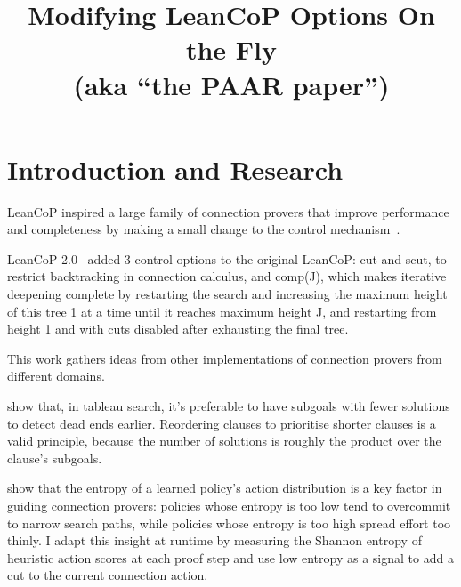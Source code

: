 \documentclass[11pt,twocolumn]{article}
\title{Modifying LeanCoP Options On the Fly \\[3pt] \large (aka ``the PAAR paper'')}
\date{}
\author{}
\newcommand{\atom}[1]{\colorbox{Gray!30}{\ttfamily #1}}
\newcommand{\citen}[1]{~\parencite{#1}}
\newcommand{\citeay}[1]{\textcite{#1}}
\begin{document}
\twocolumn[
	\centering
	\vspace{1em}
	{\LARGE Modifying LeanCoP Options On the Fly \par} \vspace{3pt}
	{\large (aka ``the PAAR paper'') \par}
	\vspace{2em}
]

\section{Introduction and Research}

LeanCoP inspired a large family of connection provers that improve performance and completeness by making a small change to the control mechanism\citen{Otten2023leanCoP20}.

LeanCoP 2.0\citen{ottenLeanCoP20} added 3 control options to the original LeanCoP: \atom{cut} and \atom{scut}, to restrict backtracking in connection calculus, and \atom{comp(J)}, which makes iterative deepening complete by restarting the search and increasing the maximum height of this tree 1 at a time until it reaches maximum height \atom{J}, and restarting from height 1 and with cuts disabled after exhausting the final tree.

This work gathers ideas from other implementations of connection provers from different domains.

\citeay{letzModelEliminationConnection2001} show that, in tableau search, it's preferable to have subgoals with fewer solutions to detect dead ends earlier.
Reordering clauses to prioritise shorter clauses is a valid principle, because the number of solutions is roughly the product over the clause's subgoals.


\citeay{zomboriRoleEntropyGuiding2021} show that the entropy of a learned policy's action distribution is a key factor in guiding connection provers: policies whose entropy is too low tend to overcommit to narrow search paths, while policies whose entropy is too high spread effort too thinly.
I adapt this insight at runtime by measuring the Shannon entropy of heuristic action scores at each proof step and use low entropy as a signal to add a \atom{cut} to the current connection action.
\end{document}
